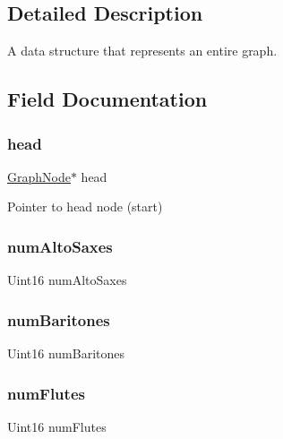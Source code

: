 \subsection{Detailed Description}
A data structure that represents an entire graph. 

\subsection{Field Documentation}
\mbox{\label{structgraph__s_a14d4df7f6c1f9d2c91c64b716680b8c8}} 
\subsubsection{\texorpdfstring{head}{head}}
{\footnotesize\ttfamily \hyperlink{ds__graph_8h_aacd6aa952164ec63f7de5c1d413f49a5}{Graph\+Node}$\ast$ head}



Pointer to head node (start) 

\mbox{\label{structgraph__s_a3dfd862f54e2c1060394efb8162fe91f}} 
\subsubsection{\texorpdfstring{num\+Alto\+Saxes}{numAltoSaxes}}
{\footnotesize\ttfamily Uint16 num\+Alto\+Saxes}

\mbox{\label{structgraph__s_a23e654bd85fc7df1caba0a10a6e70bed}} 
\subsubsection{\texorpdfstring{num\+Baritones}{numBaritones}}
{\footnotesize\ttfamily Uint16 num\+Baritones}

\mbox{\label{structgraph__s_ac587abf040d7f36a88e9e4a9f782e920}} 
\subsubsection{\texorpdfstring{num\+Flutes}{numFlutes}}
{\footnotesize\ttfamily Uint16 num\+Flutes}

